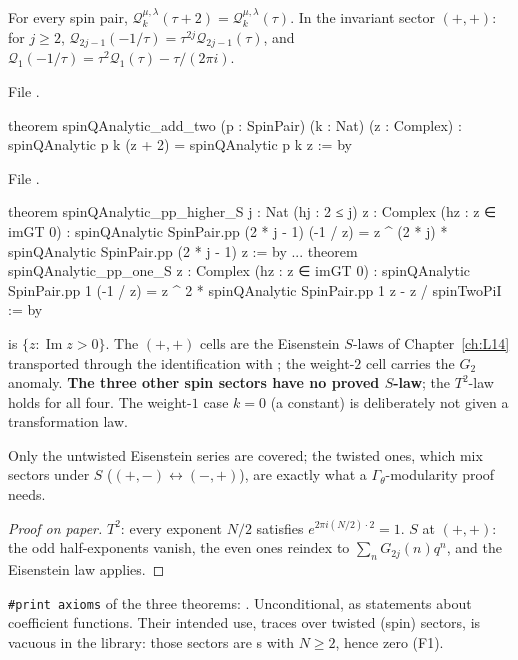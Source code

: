 \begin{theorem}\label{l17:thm:spinS}
For every spin pair, $\mathcal Q^{\mu,\lambda}_k(\tau+2)=\mathcal Q^{\mu,\lambda}_k(\tau)$. In the invariant
sector $(+,+)$: for $j\ge2$, $\mathcal Q_{2j-1}(-1/\tau)=\tau^{2j}\mathcal Q_{2j-1}(\tau)$, and
$\mathcal Q_1(-1/\tau)=\tau^2\mathcal Q_1(\tau)-\tau/(2\pi i)$.
\end{theorem}
\noindent File .
\begin{leancode}
theorem spinQAnalytic_add_two (p : SpinPair) (k : Nat) (z : Complex) :
    spinQAnalytic p k (z + 2) = spinQAnalytic p k z := by
\end{leancode}
\noindent File .
\begin{leancode}
theorem spinQAnalytic_pp_higher_S {j : Nat} (hj : 2 ≤ j) {z : Complex}
    (hz : z ∈ imGT 0) :
    spinQAnalytic SpinPair.pp (2 * j - 1) (-1 / z) =
      z ^ (2 * j) * spinQAnalytic SpinPair.pp (2 * j - 1) z := by
...
theorem spinQAnalytic_pp_one_S {z : Complex} (hz : z ∈ imGT 0) :
    spinQAnalytic SpinPair.pp 1 (-1 / z) =
      z ^ 2 * spinQAnalytic SpinPair.pp 1 z - z / spinTwoPiI := by
\end{leancode}
\begin{dictionary}
 is $\{z:\operatorname{Im}z>0\}$. The $(+,+)$ cells are the Eisenstein $S$-laws of
Chapter~\ref{ch:L14} transported through the identification with ; the weight-$2$ cell
carries the $G_2$ anomaly. \textbf{The three other spin sectors have no proved $S$-law}; the
$T^2$-law holds for all four. The weight-$1$ case $k=0$ (a constant) is deliberately not given a
transformation law.
\end{dictionary}
\begin{physics}
Only the untwisted Eisenstein series are covered; the twisted ones, which mix sectors under $S$
($(+,-)\leftrightarrow(-,+)$), are exactly what a $\Gamma_\theta$-modularity proof needs.
\end{physics}
\begin{proof}[Proof on paper]
$T^2$: every exponent $N/2$ satisfies $e^{2\pi i(N/2)\cdot2}=1$. $S$ at $(+,+)$: the odd half-exponents
vanish, the even ones reindex to $\sum_nG_{2j}(n)q^n$, and the Eisenstein law applies.
\end{proof}
\begin{status}
\texttt{\#print axioms} of the three theorems: .
Unconditional, as statements about coefficient functions. Their intended use, traces over twisted (spin) sectors, is
vacuous in the library: those sectors are s with $N\ge2$, hence zero (F1).
\end{status}

